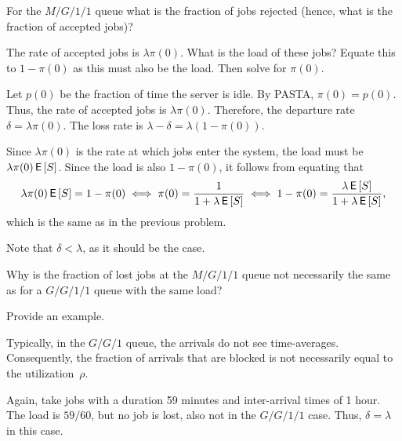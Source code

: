 \begin{exercise}[\faFlask]
  For the $M/G/1/1$ queue what is the fraction of jobs rejected
  (hence, what is the fraction of accepted jobs)?  
  \begin{hint}
The rate of
    accepted jobs is $\lambda \pi(0)$. What is the load of these jobs?
    Equate this to $1-\pi(0)$ as this must also be the load. Then solve for $\pi(0)$.
  \end{hint}
  \begin{solution}
    Let $p(0)$ be the fraction of time the server is idle. By PASTA,
    $\pi(0)=p(0)$. Thus, the rate of accepted jobs is
    $\lambda\pi(0)$. Therefore, the departure rate
    $\delta=\lambda\pi(0)$. The loss rate is
    $\lambda-\delta = \lambda (1-\pi(0))$.

    Since $\lambda\pi(0)$ is the rate at which jobs enter the system,
    the load must be $\lambda\pi(0)\,\mathsf{E}\left[S\right]$. Since the load is also
    $1-\pi(0)$, it follows from equating that
    \begin{equation*}
      \lambda\pi(0) \,\mathsf{E}\left[S\right] = 1 - \pi(0) \iff \pi(0)=\frac1{1+\lambda\,\mathsf{E}\left[S\right]} 
\iff 1-\pi(0) = \frac{\lambda \,\mathsf{E}\left[S\right]}{1+\lambda \,\mathsf{E}\left[S\right]},
    \end{equation*}
which is the same as in the previous problem.

Note that  $\delta < \lambda$, as it should be the case. 
  \end{solution}
\end{exercise}


\begin{exercise}[\faFlask]
  Why is the fraction of lost jobs at the $M/G/1/1$ queue not
  necessarily the same as for a $G/G/1/1$ queue with the same load?  
  \begin{hint}
Provide an  example.
  \end{hint}
  \begin{solution}
 Typically, in the $G/G/1$ queue, the arrivals do not see  time-averages. Consequently, the fraction of arrivals that are blocked is not necessarily equal to the utilization~$\rho$.

  Again, take jobs with a duration 59 minutes and inter-arrival times of
  1 hour. The load is $59/60$, but no job is lost, also not in the
  $G/G/1/1$ case. Thus, $\delta=\lambda$ in this case.
  \end{solution}
\end{exercise}


\begin{comment}
  
\begin{exercise}[use=false]
  Use the ideas of Section~\ref{sec:arrival-processes} to derive an
  expression for the density $f_r$ of the remaining service times as
  seen by the Poisson arrivals.  In the expression, check that it is a
  true density, in the sense that $\int_0^\infty f_r(x) \d x =1$.
  \begin{solution}
    \TBD.
  \end{solution}
\end{exercise}
\end{comment}







